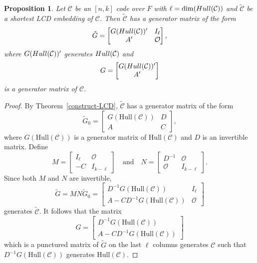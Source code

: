 \documentclass[10pt,a4paper]{amsart}
\newtheorem{proposition}{Proposition}
\begin{document}
\begin{proposition}
    Let $\mathcal{C}$ be an $[n, k]$ code over $F$ with $\ell=\dim({\rm Hull}(\mathcal{C}))$ and $\tilde{\mathcal{C}}$ be a shortest LCD embedding of $\mathcal{C}$. Then $\tilde{\mathcal{C}}$ has a generator matrix of the form
    \[
    \tilde{G}=\begin{bmatrix}
        G({\rm Hull}(\mathcal{C}))' & I_\ell\\A' & \mathcal{O}
    \end{bmatrix},
    \]
    where $G({\rm Hull}(\mathcal{C}))'$ generates ${\rm Hull}(\mathcal{C})$ and
    \[
    G=\begin{bmatrix}
        G({\rm Hull}(\mathcal{C}))'\\A'
    \end{bmatrix}
    \]
    is a generator matrix of $\mathcal{C}$.
\end{proposition}

\begin{proof}
    By Theorem~\ref{construct-LCD}, $\tilde{\mathcal{C}}$ has a generator matrix of the form
    \[
    \tilde{G}_0=\begin{bmatrix}
        G(\text{Hull}(\mathcal{C})) & D\\A & C
    \end{bmatrix},
    \]
    where $G(\text{Hull}(\mathcal{C}))$ is a generator matrix of $\text{Hull}(\mathcal{C})$ and $D$ is an invertible matrix. Define
     \[
    M=\begin{bmatrix}
        I_\ell & \mathcal{O}\\-C & I_{k-\ell}
    \end{bmatrix}\quad\mbox{and}\quad N=\begin{bmatrix}
        D^{-1} & \mathcal{O}\\\mathcal{O} & I_{k-\ell}
    \end{bmatrix}.
    \]
    Since both $M$ and $N$ are invertible,
    \[
    \tilde{G}=MN\tilde{G}_0=\begin{bmatrix}
        D^{-1}G(\text{Hull}(\mathcal{C})) & I_\ell\\A-CD^{-1}G(\text{Hull}(\mathcal{C})) & \mathcal{O}
    \end{bmatrix}
    \]
    generates $\tilde{\mathcal{C}}$. It follows that the matrix
    \[
    G=\begin{bmatrix}
        D^{-1}G(\text{Hull}(\mathcal{C}))\\A-CD^{-1}G(\text{Hull}(\mathcal{C}))
    \end{bmatrix}
    \]
    which is a punctured matrix of $\tilde{G}$ on the last $\ell$ columns generates $\mathcal{C}$ such that $D^{-1}G(\text{Hull}(\mathcal{C}))$ generates $\text{Hull}(\mathcal{C})$.
\end{proof}
\end{document}
